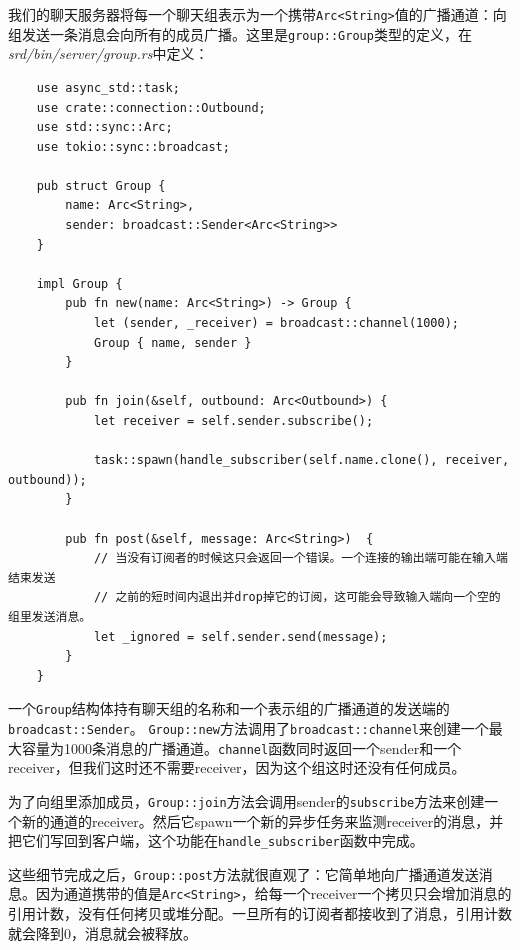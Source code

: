 我们的聊天服务器将每一个聊天组表示为一个携带\texttt{Arc<String>}值的广播通道：向组发送一条消息会向所有的成员广播。这里是\texttt{group::Group}类型的定义，在\emph{srd/bin/server/group.rs}中定义：
\begin{verbatim}
    use async_std::task;
    use crate::connection::Outbound;
    use std::sync::Arc;
    use tokio::sync::broadcast;

    pub struct Group {
        name: Arc<String>,
        sender: broadcast::Sender<Arc<String>>
    }

    impl Group {
        pub fn new(name: Arc<String>) -> Group {
            let (sender, _receiver) = broadcast::channel(1000);
            Group { name, sender }
        }

        pub fn join(&self, outbound: Arc<Outbound>) {
            let receiver = self.sender.subscribe();

            task::spawn(handle_subscriber(self.name.clone(), receiver, outbound));
        }

        pub fn post(&self, message: Arc<String>)  {
            // 当没有订阅者的时候这只会返回一个错误。一个连接的输出端可能在输入端结束发送
            // 之前的短时间内退出并drop掉它的订阅，这可能会导致输入端向一个空的组里发送消息。
            let _ignored = self.sender.send(message);
        }
    }
\end{verbatim}

一个\texttt{Group}结构体持有聊天组的名称和一个表示组的广播通道的发送端的\texttt{broadcast::Sender}。 \texttt{Group::new}方法调用了\texttt{broadcast::channel}来创建一个最大容量为1000条消息的广播通道。\texttt{channel}函数同时返回一个sender和一个receiver，但我们这时还不需要receiver，因为这个组这时还没有任何成员。

为了向组里添加成员，\texttt{Group::join}方法会调用sender的\texttt{subscribe}方法来创建一个新的通道的receiver。然后它spawn一个新的异步任务来监测receiver的消息，并把它们写回到客户端，这个功能在\texttt{handle\_subscriber}函数中完成。

这些细节完成之后，\texttt{Group::post}方法就很直观了：它简单地向广播通道发送消息。因为通道携带的值是\texttt{Arc<String>}，给每一个receiver一个拷贝只会增加消息的引用计数，没有任何拷贝或堆分配。一旦所有的订阅者都接收到了消息，引用计数就会降到0，消息就会被释放。

